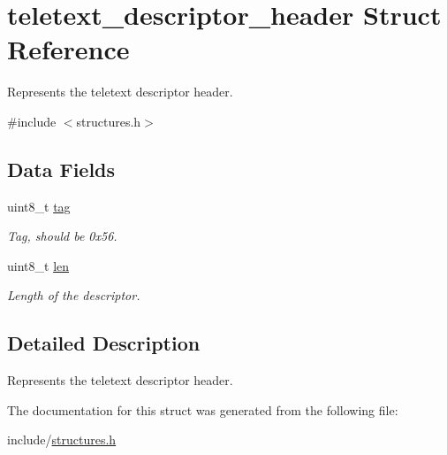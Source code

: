 \hypertarget{structteletext__descriptor__header}{}\section{teletext\+\_\+descriptor\+\_\+header Struct Reference}
\label{structteletext__descriptor__header}


Represents the teletext descriptor header.  




{\ttfamily \#include $<$structures.\+h$>$}

\subsection*{Data Fields}
\begin{DoxyCompactItemize}
\item 
uint8\+\_\+t \hyperlink{structteletext__descriptor__header_ac2b94f4990bbc8949e1d50fd666dc46d}{tag}\hypertarget{structteletext__descriptor__header_ac2b94f4990bbc8949e1d50fd666dc46d}{}\label{structteletext__descriptor__header_ac2b94f4990bbc8949e1d50fd666dc46d}

\begin{DoxyCompactList}\small\item\em Tag, should be 0x56. \end{DoxyCompactList}\item 
uint8\+\_\+t \hyperlink{structteletext__descriptor__header_a41535e9254cd6304dbb9ec6b72e0c2b4}{len}\hypertarget{structteletext__descriptor__header_a41535e9254cd6304dbb9ec6b72e0c2b4}{}\label{structteletext__descriptor__header_a41535e9254cd6304dbb9ec6b72e0c2b4}

\begin{DoxyCompactList}\small\item\em Length of the descriptor. \end{DoxyCompactList}\end{DoxyCompactItemize}


\subsection{Detailed Description}
Represents the teletext descriptor header. 

The documentation for this struct was generated from the following file\+:\begin{DoxyCompactItemize}
\item 
include/\hyperlink{structures_8h}{structures.\+h}\end{DoxyCompactItemize}
